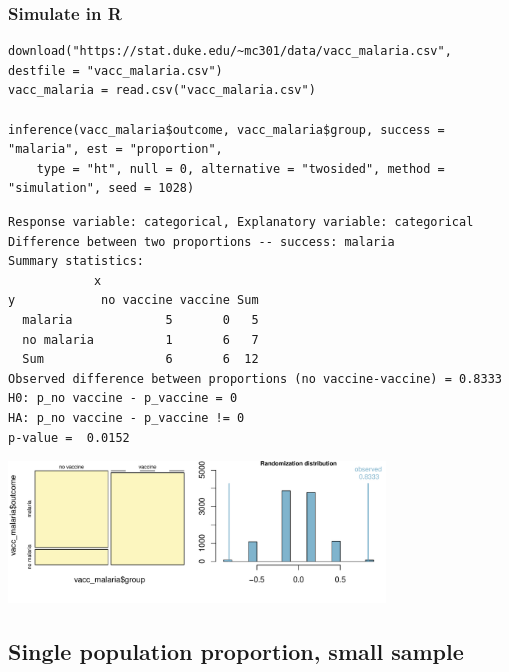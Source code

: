 \documentclass[slidestop,compress,mathserif,12pt,t,professionalfonts,xcolor=table]{beamer}
\begin{document}
\begin{frame}[fragile]
\frametitle{Simulate in R}

\vspace{-0.25cm}

{\tiny
\begin{Verbatim}[frame=single, formatcom=\color{blue}]
download("https://stat.duke.edu/~mc301/data/vacc_malaria.csv", destfile = "vacc_malaria.csv")
vacc_malaria = read.csv("vacc_malaria.csv")

inference(vacc_malaria$outcome, vacc_malaria$group, success = "malaria", est = "proportion", 
    type = "ht", null = 0, alternative = "twosided", method = "simulation", seed = 1028)
\end{Verbatim}
}

\pause

{\tiny
\begin{Verbatim}[frame=single, formatcom=\color{gray}]
Response variable: categorical, Explanatory variable: categorical
Difference between two proportions -- success: malaria
Summary statistics:
            x
y            no vaccine vaccine Sum
  malaria             5       0   5
  no malaria          1       6   7
  Sum                 6       6  12
Observed difference between proportions (no vaccine-vaccine) = 0.8333
H0: p_no vaccine - p_vaccine = 0 
HA: p_no vaccine - p_vaccine != 0 
p-value =  0.0152 
\end{Verbatim}
}

\includegraphics[width=0.75\textwidth]{figures/malaria/malaria}

\end{frame}


\subsection{Single population proportion, small sample}


\begin{frame}

\vfill


\vfill


\end{frame}
\end{document}
